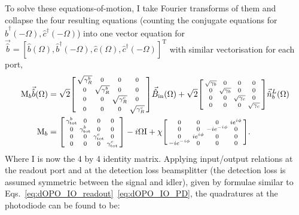 To solve these equations-of-motion, I take Fourier transforms of them and collapse the four resulting equations (counting the conjugate equations for $\hat b^\dag(-\Omega), \hat c^\dag(-\Omega)$) into one vector equation for $\vec{\hat b}=[\hat b(\Omega), \hat b^\dag(-\Omega), \hat c(\Omega), \hat c^\dag(-\Omega)]^\text{T}$ with similar vectorisation for each port,
\begin{align}
\text{M}_b\vec{\hat b}(\Omega)&=\sqrt{2}\begin{bsmallmatrix}
\sqrt{\gamma^b_R} & 0 & 0 & 0 \\
0 & \sqrt{\gamma^b_R} & 0 & 0 \\
0 & 0 & \sqrt{\gamma^c_R} & 0 \\
0 & 0 & 0 & \sqrt{\gamma^c_R}
\end{bsmallmatrix}\vec{\hat B}_\mathrm{in}(\Omega) + \sqrt{2}\begin{bsmallmatrix}
\sqrt{\gamma_b} & 0 & 0 & 0 \\
0 & \sqrt{\gamma_b} & 0 & 0 \\
0 & 0 & \sqrt{\gamma_c} & 0 \\
0 & 0 & 0 & \sqrt{\gamma_c}
\end{bsmallmatrix}\vec{\hat n}^L_b(\Omega)\\
\text{M}_b&=\begin{bsmallmatrix}
\gamma^b_\mathrm{tot} & 0 & 0 & 0 \\
0 & \gamma^b_\mathrm{tot} & 0 & 0 \\
0 & 0 & \gamma^c_\mathrm{tot} & 0 \\
0 & 0 & 0 & \gamma^c_\mathrm{tot} 
\end{bsmallmatrix}-i\Omega \text{I}+\chi \begin{bsmallmatrix}
0 & 0 & 0 & i e^{i\phi} \\
0 & 0 & -i e^{-i\phi} & 0 \\
0 & i e^{i\phi} & 0 & 0 \\
-i e^{-i\phi} & 0 & 0 & 0
\end{bsmallmatrix}.
\end{align}
Where $\text{I}$  is now the 4 by 4 identity matrix. Applying input/output relations at the readout port and at the detection loss beamsplitter (the detection loss is assumed symmetric between the signal and idler), given by formulae similar to Eqs.~\ref{eq:dOPO_IO_readout}~\ref{eq:dOPO_IO_PD}, the quadratures at the photodiode can be found to be:
